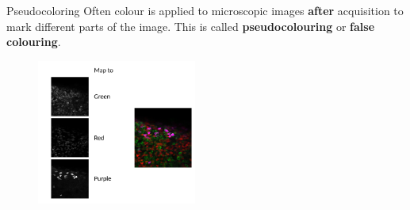 \documentclass[9pt, aspectratio=169]{beamer}
\begin{document}
\begin{frame}
    {Pseudocoloring}
    Often colour is applied to microscopic images \textbf{after} acquisition to mark different parts of the image. This is called \textbf{pseudocolouring} or \textbf{false colouring}.
    \begin{figure}
        \centering
        \includegraphics[height=180px]{pseudocolor.png}
    \end{figure}
\end{frame}
\end{document}
